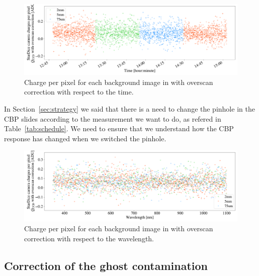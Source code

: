 \begin{figure}[h]
    \centering
    \includegraphics[width=\columnwidth]{fig/background_stationary_time.pdf}
    \caption{Charge per pixel for each background image in \SD with overscan correction with respect to the time.}
    \label{fig:stationarity_time}
\end{figure}
In Section~\ref{sec:strategy} we said that there is a need to change the pinhole in the CBP slides according to the measurement we want to do, as refered in Table~\ref{tab:schedule}. We need to ensure that we understand how the CBP response has changed when we switched the pinhole. 
\begin{figure}[h]
    \centering
    \includegraphics[width=\columnwidth]{fig/background_stationary_wavelength.pdf}
    \caption{Charge per pixel for each background image in \SD with overscan correction with respect to the wavelength.}
    \label{fig:stationarity_wl}
\end{figure}


\subsection{Correction of the ghost contamination}

